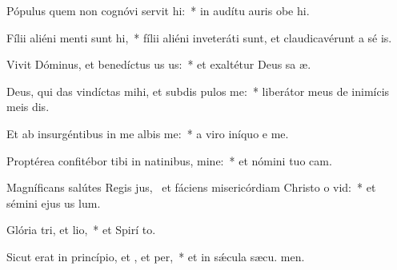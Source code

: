 \item Pópulus quem non cognóvi servit hi:~* in audítu auris obe hi.
\item Fílii aliéni menti sunt hi,~* fílii aliéni inveteráti sunt, et claudicavérunt a sé is.
\item Vivit Dóminus, et benedíctus us us:~* et exaltétur Deus sa æ.
\item Deus, qui das vindíctas mihi, et subdis pulos  me:~* liberátor meus de inimícis meis dis.
\item Et ab insurgéntibus in me albis me:~* a viro iníquo e me.
\item Proptérea confitébor tibi in natinibus, mine:~* et nómini tuo  cam.
\item Magníficans salútes Regis jus,~\pscross{} et fáciens misericórdiam Christo o vid:~* et sémini ejus us  lum.
\item Glória tri, et lio,~* et Spirí to.
\item Sicut erat in princípio, et , et per,~* et in sǽcula sæcu. men.
